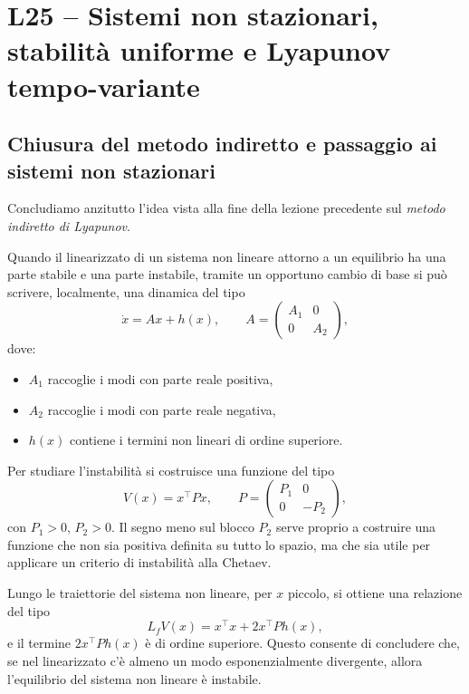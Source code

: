 
\chapter{L25 -- Sistemi non stazionari, stabilit\`a uniforme e Lyapunov tempo-variante}
\label{chap:L25}

\section{Chiusura del metodo indiretto e passaggio ai sistemi non stazionari}

Concludiamo anzitutto l'idea vista alla fine della lezione precedente sul \emph{metodo indiretto di Lyapunov}.

Quando il linearizzato di un sistema non lineare attorno a un equilibrio ha una parte stabile e una parte instabile, tramite un opportuno cambio di base si pu\`o scrivere, localmente, una dinamica del tipo
\[
\dot x = Ax + h(x),
\qquad
A=
\begin{pmatrix}
A_1 & 0\\
0 & A_2
\end{pmatrix},
\]
dove:
\begin{itemize}
    \item \(A_1\) raccoglie i modi con parte reale positiva,
    \item \(A_2\) raccoglie i modi con parte reale negativa,
    \item \(h(x)\) contiene i termini non lineari di ordine superiore.
\end{itemize}

Per studiare l'instabilit\`a si costruisce una funzione del tipo
\[
V(x)=x^\top P x,
\qquad
P=
\begin{pmatrix}
P_1 & 0\\
0 & -P_2
\end{pmatrix},
\]
con \(P_1>0\), \(P_2>0\).  
Il segno meno sul blocco \(P_2\) serve proprio a costruire una funzione che non sia positiva definita su tutto lo spazio, ma che sia utile per applicare un criterio di instabilit\`a alla Chetaev.

Lungo le traiettorie del sistema non lineare, per \(x\) piccolo, si ottiene una relazione del tipo
\[
L_fV(x)=x^\top x + 2x^\top P h(x),
\]
e il termine \(2x^\top P h(x)\) \`e di ordine superiore.  
Questo consente di concludere che, se nel linearizzato c'\`e almeno un modo esponenzialmente divergente, allora l'equilibrio del sistema non lineare \`e instabile.

